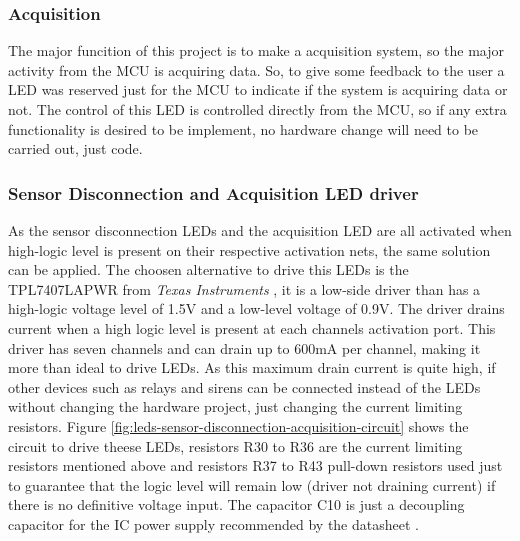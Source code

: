 		\subsubsection{Acquisition}\label{sssec:acquisition-led}

			The major funcition of this project is to make a acquisition system, so the major activity from the MCU is acquiring data. So, to give some feedback to the user a LED was reserved just for the MCU to indicate if the system is acquiring data or not. The control of this LED is controlled directly from the MCU, so if any extra functionality is desired to be implement, no hardware change will need to be carried out, just code.

		\subsubsection{Sensor Disconnection and Acquisition LED driver}\label{sssec:sensor-disconnection-and-acquisition-led-driver}

			As the sensor disconnection LEDs and the acquisition LED are all activated when high-logic level is present on their respective activation nets, the same solution can be applied. The choosen alternative to drive this LEDs is the TPL7407LAPWR from \textit{Texas Instruments} \cite{TPL7407LAPWR-datasheet}, it is a low-side driver than has a high-logic voltage level of 1.5V and a low-level voltage of 0.9V. The driver drains current when a high logic level is present at each channels activation port. This driver has seven channels and can drain up to 600mA per channel, making it more than ideal to drive LEDs. As this maximum drain current is quite high, if other devices such as relays and sirens can be connected instead of the LEDs without changing the hardware project, just changing the current limiting resistors. Figure \ref{fig:leds-sensor-disconnection-acquisition-circuit} shows the circuit to drive theese LEDs, resistors R30 to R36 are the current limiting resistors mentioned above and resistors R37 to R43 pull-down resistors used just to guarantee that the logic level will remain low (driver not draining current) if there is no definitive voltage input. The capacitor C10 is just a decoupling capacitor for the IC power supply recommended by the datasheet \cite{TPL7407LAPWR-datasheet}.


